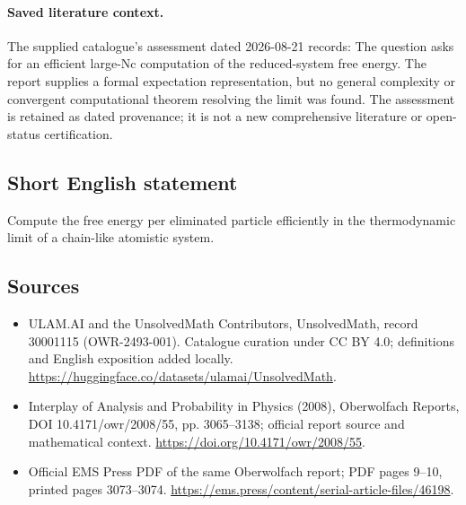 \documentclass[11pt]{article}
\begin{document}
\paragraph{Saved literature context.} The supplied catalogue's assessment dated 2026-08-21 records: The question asks for an efficient large-Nc computation of the reduced-system free energy. The report supplies a formal expectation representation, but no general complexity or convergent computational theorem resolving the limit was found. The assessment is retained as dated provenance; it is not a new comprehensive literature or open-status certification.
\subsection{Short English statement}
Compute the free energy per eliminated particle efficiently in the thermodynamic limit of a chain-like atomistic system.
\subsection{Sources}
\begin{itemize}
\item[\hypertarget{source:30001115:1}{S1}] ULAM.AI and the UnsolvedMath Contributors, UnsolvedMath, record 30001115 (OWR-2493-001). Catalogue curation under CC BY 4.0; definitions and English exposition added locally.
\url{https://huggingface.co/datasets/ulamai/UnsolvedMath}.
\item[\hypertarget{source:30001115:2}{S2}] Interplay of Analysis and Probability in Physics (2008), Oberwolfach Reports, DOI 10.4171/owr/2008/55, pp. 3065--3138; official report source and mathematical context.
\url{https://doi.org/10.4171/owr/2008/55}.
\item[\hypertarget{source:30001115:3}{S3}] Official EMS Press PDF of the same Oberwolfach report; PDF pages 9--10, printed pages 3073--3074.
\url{https://ems.press/content/serial-article-files/46198}.
\end{itemize}
\label{end:30001115}
\end{document}
